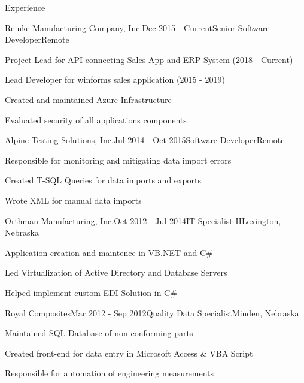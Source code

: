 \documentclass{resume} %
\begin{document}

\begin{rSection}{Experience}

\begin{rSubsection}{Reinke Manufacturing Company, Inc.}{Dec 2015 - Current}{Senior Software Developer}{Remote}
\item Project Lead for API connecting Sales App and ERP System (2018 - Current)
\item Lead Developer for winforms sales application (2015 - 2019)
\item Created and maintained Azure Infrastructure
\item Evaluated security of all applications components
\end{rSubsection}

\begin{rSubsection}{Alpine Testing Solutions, Inc.}{Jul 2014 - Oct 2015}{Software Developer}{Remote}
\item Responsible for monitoring and mitigating data import errors 
\item Created T-SQL Queries for data imports and exports
\item Wrote XML for manual data imports
\end{rSubsection}

\begin{rSubsection}{Orthman Manufacturing, Inc.}{Oct 2012 - Jul 2014}{IT Specialist II}{Lexington, Nebraska}
\item Application creation and maintence in VB.NET and C\#
\item Led Virtualization of Active Directory and Database Servers
\item Helped implement custom EDI Solution in C\#

\end{rSubsection}

\begin{rSubsection}{Royal Composites}{Mar 2012 - Sep 2012}{Quality Data Specialist}{Minden, Nebraska}
\item Maintained SQL Database of non-conforming parts
\item Created front-end for data entry in Microsoft Access \& VBA Script
\item Responsible for automation of engineering measurements
\end{rSubsection}


\end{rSection}
\end{document}
